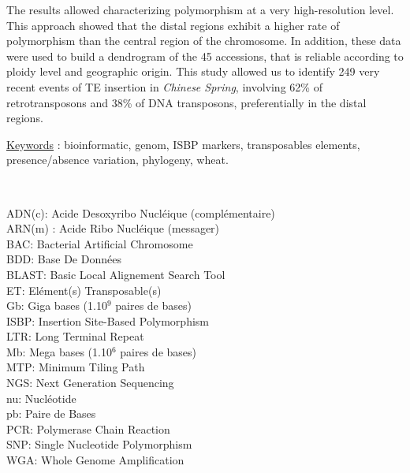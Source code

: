 \documentclass[a4paper, 12pt]{article}
\newcommand{\nocontentsline}[3]{}
\newcommand{\tocless}[2]{\bgroup\let\addcontentsline=\nocontentsline#1{#2}\egroup}
\begin{document}
\begin{onehalfspace}
The results allowed characterizing polymorphism at a very high-resolution level. This approach showed that the distal regions exhibit a higher rate of polymorphism than the central region of the chromosome. In addition, these data were used to build a dendrogram of the 45 accessions, that is reliable according to ploidy level and geographic origin. This study allowed us to identify 249 very recent events of TE insertion in \textit{Chinese Spring}, involving 62\% of retrotransposons and 38\% of DNA transposons, preferentially in the distal regions.

\begin{flushright}
\underline{Keywords} : bioinformatic, genom, ISBP markers, transposables elements, presence/absence variation, phylogeny, wheat.
\end{flushright}


\newpage
\thispagestyle{empty}
~\\
\parindent=0cm

ADN(c): Acide Desoxyribo Nucléique (complémentaire)\\
ARN(m) : Acide Ribo Nucléique (messager)\\
BAC: Bacterial Artificial Chromosome\\
BDD: Base De Données\\
BLAST: Basic Local Alignement Search Tool\\
ET: Elément(s) Transposable(s)\\
Gb: Giga bases (1.10$^{9}$ paires de bases)\\
ISBP: Insertion Site-Based Polymorphism\\
LTR: Long Terminal Repeat\\
Mb: Mega bases (1.10$^{6}$ paires de bases)\\
MTP: Minimum Tiling Path\\
NGS: Next Generation Sequencing\\
nu: Nucléotide\\
pb: Paire de Bases\\
PCR: Polymerase Chain Reaction\\
SNP: Single Nucleotide Polymorphism\\
WGA: Whole Genome Amplification\\


\end{onehalfspace}
\end{document}
